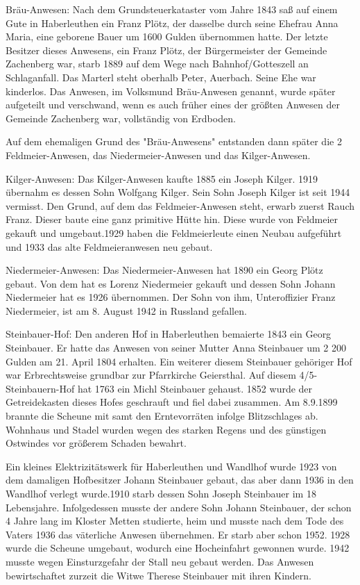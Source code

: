 Bräu-Anwesen: Nach dem Grundsteuerkataster vom Jahre 1843 saß auf einem Gute in
Haberleuthen ein Franz Plötz, der dasselbe durch seine Ehefrau Anna Maria, eine
geborene Bauer um 1600 Gulden übernommen hatte. Der letzte Besitzer dieses
Anwesens, ein Franz Plötz, der Bürgermeister der Gemeinde Zachenberg war, starb
1889 auf dem Wege nach Bahnhof/Gotteszell an Schlaganfall. Das Marterl steht
oberhalb Peter, Auerbach. Seine Ehe war kinderlos. Das Anwesen, im Volksmund
Bräu-Anwesen genannt, wurde später aufgeteilt und verschwand, wenn es auch
früher eines der größten Anwesen der Gemeinde Zachenberg war, vollständig von
Erdboden.

Auf dem ehemaligen Grund des "Bräu-Anwesens" entstanden dann später die 2
Feldmeier-Anwesen, das Niedermeier-Anwesen und das Kilger-Anwesen.

Kilger-Anwesen: Das Kilger-Anwesen kaufte 1885 ein Joseph Kilger. 1919 übernahm
es dessen Sohn Wolfgang Kilger. Sein Sohn Joseph Kilger ist seit 1944 vermisst.
Den Grund, auf dem das Feldmeier-Anwesen steht, erwarb zuerst Rauch Franz.
Dieser baute eine ganz primitive Hütte hin. Diese wurde von Feldmeier gekauft
und umgebaut.1929 haben die Feldmeierleute einen Neubau aufgeführt und 1933 das
alte Feldmeieranwesen neu gebaut.

Niedermeier-Anwesen: Das Niedermeier-Anwesen hat 1890 ein Georg Plötz gebaut.
Von dem hat es Lorenz Niedermeier gekauft und dessen Sohn Johann Niedermeier hat
es 1926 übernommen. Der Sohn von ihm, Unteroffizier Franz Niedermeier, ist am 8.
August 1942 in Russland gefallen.

Steinbauer-Hof: Den anderen Hof in Haberleuthen bemaierte 1843 ein Georg
Steinbauer. Er hatte das Anwesen von seiner Mutter Anna Steinbauer um 2 200
Gulden am 21. April 1804 erhalten. Ein weiterer diesem Steinbauer gehöriger Hof
war Erbrechtsweise grundbar zur Pfarrkirche Geiersthal. Auf diesem
4/5-Steinbauern-Hof hat 1763 ein Michl Steinbauer gehaust. 1852 wurde der
Getreidekasten dieses Hofes geschrauft und fiel dabei zusammen. Am 8.9.1899
brannte die Scheune mit samt den Erntevorräten infolge Blitzschlages ab.
Wohnhaus und Stadel wurden wegen des starken Regens und des günstigen Ostwindes
vor größerem Schaden bewahrt.

Ein kleines Elektrizitätswerk für Haberleuthen und Wandlhof wurde 1923 von dem
damaligen Hofbesitzer Johann Steinbauer gebaut, das aber dann 1936 in den
Wandlhof verlegt wurde.1910 starb dessen Sohn Joseph Steinbauer im 18
Lebensjahre. Infolgedessen musste der andere Sohn Johann Steinbauer, der schon 4
Jahre lang im Kloster Metten studierte, heim und musste nach dem Tode des Vaters
1936 das väterliche Anwesen übernehmen. Er starb aber schon 1952. 1928 wurde die
Scheune umgebaut, wodurch eine Hocheinfahrt gewonnen wurde. 1942 musste wegen
Einsturzgefahr der Stall neu gebaut werden. Das Anwesen bewirtschaftet zurzeit
die Witwe Therese Steinbauer mit ihren Kindern.

